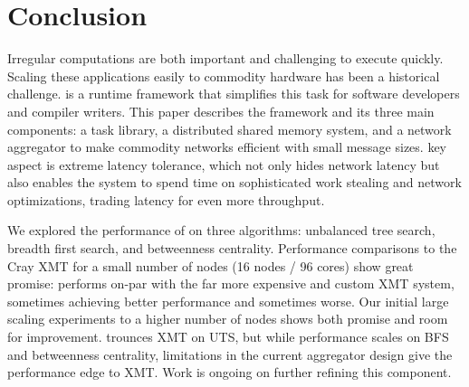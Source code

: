 \section{Conclusion}

Irregular computations are both important and challenging to execute quickly.
Scaling these applications easily to commodity hardware has been a historical
challenge. \Grappa is a runtime framework that simplifies this task for
software developers and compiler writers. This paper describes the \Grappa
framework and its three main components: a task library, a distributed shared
memory system, and a network aggregator to make commodity networks efficient
with small message sizes. \Grappa key aspect is extreme latency tolerance,
which not only hides network latency but also enables the system to spend time
on sophisticated work stealing and network optimizations, trading latency for
even more throughput.

We explored the performance of \Grappa on three algorithms: unbalanced tree
search, breadth first search, and betweenness centrality. Performance
comparisons to the Cray XMT for a small number of nodes (16 nodes / 96 cores)
show great promise: \Grappa performs on-par with the far more expensive and
custom XMT system, sometimes achieving better performance and sometimes worse.
Our initial large scaling experiments to a higher number of nodes shows both promise and room for improvement.  \Grappa trounces XMT on UTS, but while \Grappa performance scales on BFS and betweenness centrality, limitations in the current aggregator design give the performance edge to XMT.  Work is ongoing on further refining this component.
